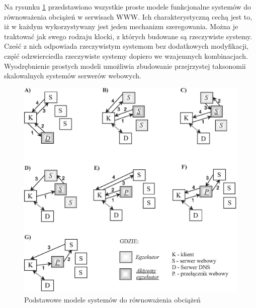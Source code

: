Na rysunku \ref{proste_modele} przedstawiono wszystkie proste modele funkcjonalne systemów do równoważenia obciążeń w serwisach WWW. 
Ich charakterystyczną cechą jest to, iż w każdym wykorzystywany jest jeden mechanizm szeregowania. Można je traktować jak 
swego rodzaju klocki, z których budowane są rzeczywiste systemy. Cześć z nich odpowiada rzeczywistym systemom bez dodatkowych 
modyfikacji, część odzwierciedla rzeczywiste systemy dopiero we wzajemnych kombinacjach. Wyodrębnienie prostych modeli 
umożliwia zbudowanie przejrzystej taksonomii skalowalnych systemów serwerów webowych.

\begin{figure}[h]
\centering
\includegraphics[width=4.9in]{./rysunki/modele_podstawowe.eps}
\caption{Podstawowe modele systemów do równoważenia obciążeń}
\label{proste_modele}
\end{figure}

